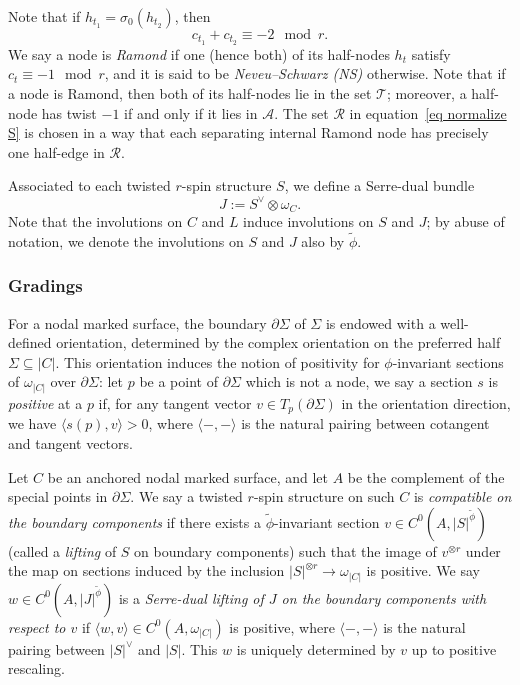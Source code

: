 \documentclass[11pt]{amsart}
\theoremstyle{definition}
\theoremstyle{remark}
\newcommand{\<}{\left<}
\renewcommand{\>}{\right>}
\numberwithin{equation}{section}
\begin{document}
Note that if $h_{t_1}=\sigma_0(h_{t_2})$, then
\begin{equation}\label{eq sum of twist at node}c_{t_1} + c_{t_2} \equiv -2 \mod r.\end{equation}
We say a node is \textit{Ramond} if one (hence both) of its half-nodes $h_t$ satisfy $c_t \equiv -1 \mod r$,  and it is said to be \textit{Neveu--Schwarz (NS)} otherwise. Note that if a node is Ramond, then both of its half-nodes lie in the set $\mathcal T$; moreover, a half-node has twist $-1$ if and only if it lies in $\mathcal A$. The set $\mathcal{R}$ in equation~\eqref{eq normalize S} is chosen in a way that each separating internal Ramond node has precisely
one half-edge in $\mathcal{R}.$ 


Associated to each twisted $r$-spin structure $S$, we define a Serre-dual bundle \begin{equation}\label{def of J}
    J:=S^{\vee} \otimes \omega_{C}.
\end{equation}
Note that the involutions on $C$ and $L$ induce involutions on $S$ and $J$; by abuse of notation, we denote the involutions on $S$ and $J$ also by $\widetilde{\phi}$.


\subsubsection{Gradings}
For a nodal marked surface, the boundary ${\partial}\Sigma$ of $\Sigma$ is endowed with a well-defined orientation, determined by the complex orientation on the preferred half $\Sigma \subseteq |C|$. This orientation induces the notion of positivity for $\phi$-invariant sections of $\omega_{|C|}$ over ${\partial} \Sigma$: let $p$ be a point of $\partial \Sigma$ which is not a node, we say a section $s$ is \textit{positive} at a $p$ if, for any tangent vector $v \in T_p({\partial} \Sigma)$ in the orientation direction, we have $\langle s(p), v \rangle > 0$, where $\langle -, - \rangle$ is the natural pairing between cotangent and tangent vectors.



Let $C$ be an anchored nodal marked surface, and let $A$ be the complement of the special points in $\partial \Sigma$.  We say a twisted $r$-spin structure on such $C$ is \textit{compatible on the boundary components} if there exists a $\widetilde{\phi}$-invariant section $v \in C^0\left(A, |S|^{\widetilde{\phi}}\right)$ (called a \textit{lifting} of $S$  on boundary components) such that the image of $v^{\otimes r}$ under the map on sections induced by the inclusion $|S|^{\otimes r} \to  \omega_{|C|}$ is positive.  We say $w \in C^0\left(A, |J|^{\widetilde{\phi}}\right)$ is a \textit{Serre-dual lifting of $J$ on the boundary components with respect to $v$} if $\langle w, v \rangle \in C^0(A, \omega_{|C|})$ is positive, where $\langle -, - \rangle$ is the natural pairing between $|S|^{\vee}$ and $|S|$.  This $w$ is uniquely determined by $v$ up to positive rescaling.
\end{document}
